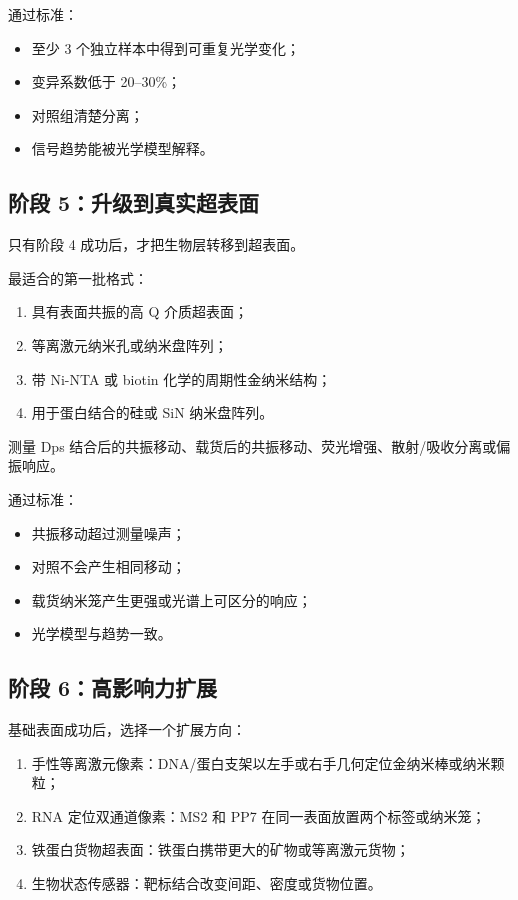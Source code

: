 \documentclass[11pt]{ctexart}
\begin{document}
通过标准：

\begin{itemize}
\item 至少 3 个独立样本中得到可重复光学变化；
\item 变异系数低于 20--30\%；
\item 对照组清楚分离；
\item 信号趋势能被光学模型解释。
\end{itemize}

\subsection{阶段 5：升级到真实超表面}

只有阶段 4 成功后，才把生物层转移到超表面。

最适合的第一批格式：

\begin{enumerate}
\item 具有表面共振的高 Q 介质超表面；
\item 等离激元纳米孔或纳米盘阵列；
\item 带 Ni-NTA 或 biotin 化学的周期性金纳米结构；
\item 用于蛋白结合的硅或 SiN 纳米盘阵列。
\end{enumerate}

测量 Dps 结合后的共振移动、载货后的共振移动、荧光增强、散射/吸收分离或偏振响应。

通过标准：

\begin{itemize}
\item 共振移动超过测量噪声；
\item 对照不会产生相同移动；
\item 载货纳米笼产生更强或光谱上可区分的响应；
\item 光学模型与趋势一致。
\end{itemize}

\subsection{阶段 6：高影响力扩展}

基础表面成功后，选择一个扩展方向：

\begin{enumerate}
\item 手性等离激元像素：DNA/蛋白支架以左手或右手几何定位金纳米棒或纳米颗粒；
\item RNA 定位双通道像素：MS2 和 PP7 在同一表面放置两个标签或纳米笼；
\item 铁蛋白货物超表面：铁蛋白携带更大的矿物或等离激元货物；
\item 生物状态传感器：靶标结合改变间距、密度或货物位置。
\end{enumerate}
\end{document}

